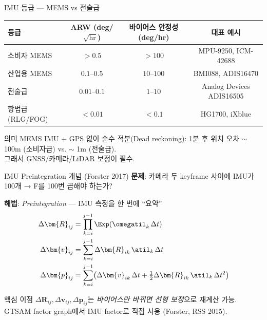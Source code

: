 \begin{frame}{IMU 등급 — MEMS vs 전술급}
  \begin{center}\footnotesize
  \begin{tabular}{lccc}
    \toprule
    등급 & ARW (deg/$\sqrt{\text{hr}}$) & 바이어스 안정성 (deg/hr) & 대표 예시 \\
    \midrule
    소비자 MEMS & $> 0.5$ & $> 100$ & MPU-9250, ICM-42688 \\
    산업용 MEMS & $0.1$--$0.5$ & $10$--$100$ & BMI088, ADIS16470 \\
    전술급 & $0.01$--$0.1$ & $1$--$10$ & Analog Devices ADIS16505 \\
    항법급 (RLG/FOG) & $< 0.01$ & $< 0.1$ & HG1700, iXblue \\
    \bottomrule
  \end{tabular}
  \end{center}
  \pause
  \vspace{0.2em}
  \begin{block}{의미}
    MEMS IMU + GPS 없이 순수 적분(Dead reckoning):
    1분 후 위치 오차 $\sim$ 100m (소비자급) vs. $\sim$ 1m (전술급). \\
    그래서 GNSS/카메라/LiDAR 보정이 필수.
  \end{block}
\end{frame}

\begin{frame}[shrink=8]{IMU Preintegration 개념 (Forster 2017)}
  \textbf{문제}: 카메라 두 keyframe 사이에 IMU가 100개 → F를 100번 곱해야 하는가?

  \textbf{해법}: \emph{Preintegration} — IMU 측정을 한 번에 ``요약''
  \begin{align*}
    \Delta\bm{R}_{ij} &= \prod_{k=i}^{j-1} \Exp(\omegatil_k\,\Delta t) \\
    \Delta\bm{v}_{ij} &= \sum_{k=i}^{j-1} \Delta\bm{R}_{ik}\,\atil_k\,\Delta t \\
    \Delta\bm{p}_{ij} &= \sum_{k=i}^{j-1} \!\left(\Delta\bm{v}_{ik}\,\Delta t
                        + \tfrac{1}{2}\Delta\bm{R}_{ik}\,\atil_k\,\Delta t^2\right)
  \end{align*}
  \pause
  \begin{block}{핵심 이점}
    $\Delta\bm{R}_{ij}, \Delta\bm{v}_{ij}, \Delta\bm{p}_{ij}$는 \emph{바이어스만 바뀌면 선형 보정}으로 재계산 가능.\\
    GTSAM factor graph에서 IMU factor로 직접 사용 (Forster, RSS 2015).
  \end{block}
\end{frame}

